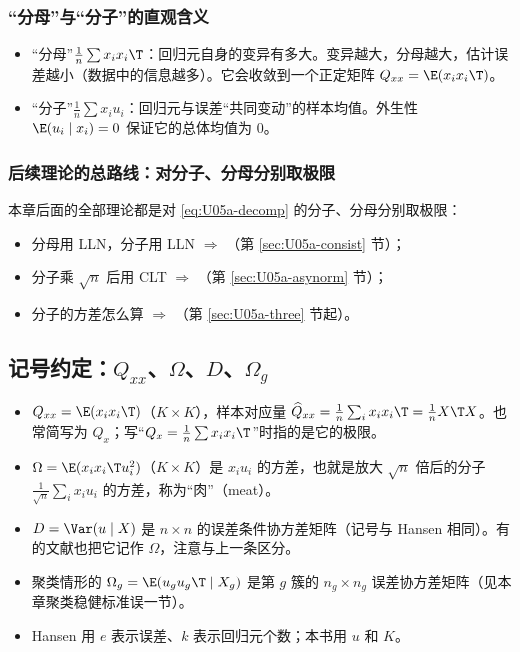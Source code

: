 \subsubsection{“分母”与“分子”的直观含义}

\begin{itemize}
\item “分母”$\frac1n\sum x_ix_i\T$：回归元自身的变异有多大。变异越大，分母越大，估计误差越小（数据中的信息越多）。它会收敛到一个正定矩阵 $Q_{xx}=\E(x_ix_i\T)$。
\item “分子”$\frac1n\sum x_iu_i$：回归元与误差“共同变动”的样本均值。外生性 $\E(u_i\mid x_i)=0$ 保证它的总体均值为 0。
\end{itemize}

\subsubsection{后续理论的总路线：对分子、分母分别取极限}

本章后面的全部理论都是对 \eqref{eq:U05a-decomp} 的分子、分母分别取极限：
\begin{itemize}
\item 分母用 LLN，分子用 LLN $\Rightarrow$ （第 \ref{sec:U05a-consist} 节）；
\item 分子乘 $\sqrt n$ 后用 CLT $\Rightarrow$ （第 \ref{sec:U05a-asynorm} 节）；
\item 分子的方差怎么算 $\Rightarrow$ （第 \ref{sec:U05a-three} 节起）。
\end{itemize}

\subsection{记号约定：\texorpdfstring{$Q_{xx}$、$\Omega$、$D$、$\Omega_g$}{Qxx, Omega, D, Omega\_g}}

\begin{itemize}
\item $Q_{xx}=\E(x_ix_i\T)$（$K\times K$），样本对应量 $\widehat Q_{xx}=\frac1n\sum_i x_ix_i\T=\frac1nX\T X$。也常简写为 $Q_x$；写“$Q_x=\frac1n\sum x_ix_i\T$”时指的是它的极限。
\item $\Omega=\E(x_ix_i\T u_i^2)$（$K\times K$）是 $x_iu_i$ 的方差，也就是放大 $\sqrt n$ 倍后的分子 $\frac1{\sqrt n}\sum_i x_iu_i$ 的方差，称为“肉”（meat）。
\item $D=\Var(u\mid X)$ 是 $n\times n$ 的误差条件协方差矩阵（记号与 Hansen 相同）。有的文献也把它记作 $\Omega$，注意与上一条区分。
\item 聚类情形的 $\Omega_g=\E(u_gu_g\T\mid X_g)$ 是第 $g$ 簇的 $n_g\times n_g$ 误差协方差矩阵（见本章聚类稳健标准误一节）。
\item Hansen 用 $e$ 表示误差、$k$ 表示回归元个数；本书用 $u$ 和 $K$。
\end{itemize}

